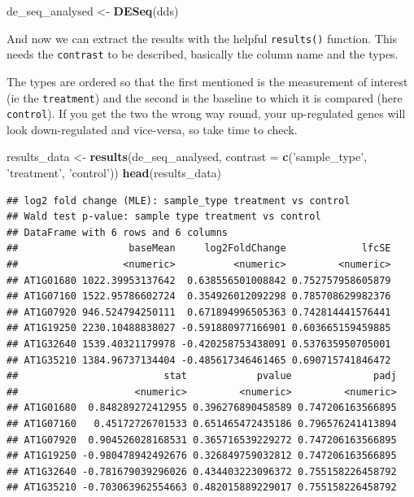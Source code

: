 \documentclass[]{book}
\newenvironment{Shaded}{\begin{snugshade}}{\end{snugshade}}
\newcommand{\DataTypeTok}[1]{\textcolor[rgb]{0.13,0.29,0.53}{#1}}
\newcommand{\KeywordTok}[1]{\textcolor[rgb]{0.13,0.29,0.53}{\textbf{#1}}}
\newcommand{\NormalTok}[1]{#1}
\newcommand{\StringTok}[1]{\textcolor[rgb]{0.31,0.60,0.02}{#1}}
\begin{document}
\begin{Shaded}
\begin{Highlighting}[]
\NormalTok{de_seq_analysed <-}\StringTok{ }\KeywordTok{DESeq}\NormalTok{(dds)}
\end{Highlighting}
\end{Shaded}

And now we can extract the results with the helpful \texttt{results()} function. This needs the \texttt{contrast} to be described, basically the column name and the types.

The types are ordered so that the first mentioned is the measurement of interest (ie the \texttt{treatment}) and the second is the baseline to which it is compared (here \texttt{control}). If you get the two the wrong way round, your up-regulated genes will look down-regulated and vice-versa, so take time to check.

\begin{Shaded}
\begin{Highlighting}[]
\NormalTok{results_data <-}\StringTok{ }\KeywordTok{results}\NormalTok{(de_seq_analysed, }\DataTypeTok{contrast =} \KeywordTok{c}\NormalTok{(}\StringTok{'sample_type'}\NormalTok{, }\StringTok{'treatment'}\NormalTok{, }\StringTok{'control'}\NormalTok{))}
\KeywordTok{head}\NormalTok{(results_data)}
\end{Highlighting}
\end{Shaded}

\begin{verbatim}
## log2 fold change (MLE): sample_type treatment vs control 
## Wald test p-value: sample type treatment vs control 
## DataFrame with 6 rows and 6 columns
##                   baseMean     log2FoldChange             lfcSE
##                  <numeric>          <numeric>         <numeric>
## AT1G01680 1022.39953137642  0.638556501008842 0.752757958605879
## AT1G07160 1522.95786602724  0.354926012092298 0.785708629982376
## AT1G07920 946.524794250111  0.671894996505363 0.742814441576441
## AT1G19250 2230.10488838027 -0.591880977166901 0.603665159459885
## AT1G32640 1539.40321179978 -0.420258753438091 0.537635950705001
## AT1G35210 1384.96737134404 -0.485617346461465 0.690715741846472
##                         stat            pvalue              padj
##                    <numeric>         <numeric>         <numeric>
## AT1G01680  0.848289272412955 0.396276890458589 0.747206163566895
## AT1G07160   0.45172726701533 0.651465472435186 0.796576241413894
## AT1G07920  0.904526028168531 0.365716539229272 0.747206163566895
## AT1G19250 -0.980478942492676 0.326849759032812 0.747206163566895
## AT1G32640 -0.781679039296026 0.434403223096372 0.755158226458792
## AT1G35210 -0.703063962554663 0.482015889229017 0.755158226458792
\end{verbatim}
\end{document}
